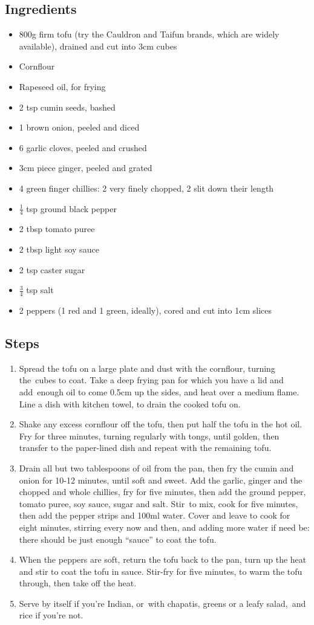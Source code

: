 \documentclass{book}
\begin{document}
\subsection*{Ingredients}
\begin{itemize}
\item 800g firm tofu (try the Cauldron and Taifun brands, which are widely available), drained and cut into 3cm cubes
\item Cornflour
\item Rapeseed oil, for frying 
\item 2 tsp cumin seeds, bashed  
\item 1 brown onion, peeled and diced
\item 6 garlic cloves, peeled and crushed
\item 3cm piece ginger, peeled and grated
\item 4 green finger chillies: 2 very finely chopped, 2 slit down their length
\item $\frac{1}{4}$ tsp ground black pepper
\item 2 tbsp tomato puree
\item 2 tbsp light soy sauce
\item 2 tsp caster sugar
\item $\frac{3}{4}$ tsp salt
\item 2 peppers (1 red and 1 green, ideally), cored and cut into 1cm slices 
\end{itemize}

\subsection*{Steps}
\begin{enumerate}
\item Spread the tofu on a large plate and dust with the cornflour, turning the cubes to coat. Take a deep frying pan for which you have a lid and add enough oil to come 0.5cm up the sides, and heat over a medium flame. Line a dish with kitchen towel, to drain the cooked tofu on.
\item Shake any excess cornflour off the tofu, then put half the tofu in the hot oil. Fry for three minutes, turning regularly with tongs, until golden, then transfer to the paper-lined dish and repeat with the remaining tofu.
\item Drain all but two tablespoons of oil from the pan, then fry the cumin and onion for 10-12 minutes, until soft and sweet. Add the garlic, ginger and the chopped and whole chillies, fry for five minutes, then add the ground pepper, tomato puree, soy sauce, sugar and salt. Stir to mix, cook for five minutes, then add the pepper strips and 100ml water. Cover and leave to cook for eight minutes, stirring every now and then, and adding more water if need be: there should be just enough “sauce” to coat the tofu.
\item When the peppers are soft, return the tofu back to the pan, turn up the heat and stir to coat the tofu in sauce. Stir-fry for five minutes, to warm the tofu through, then take off the heat.
\item Serve by itself if you’re Indian, or with chapatis, greens or a leafy salad, and rice if you’re not.
\end{enumerate}
\newpage
\end{document}

